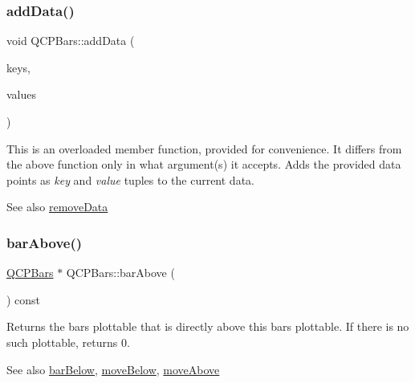 \subsubsection{\texorpdfstring{add\+Data()}{addData()}\hspace{0.1cm}{\footnotesize\ttfamily [4/4]}}
{\footnotesize\ttfamily void Q\+C\+P\+Bars\+::add\+Data (\begin{DoxyParamCaption}\item[{const Q\+Vector$<$ double $>$ \&}]{keys,  }\item[{const Q\+Vector$<$ double $>$ \&}]{values }\end{DoxyParamCaption})}

This is an overloaded member function, provided for convenience. It differs from the above function only in what argument(s) it accepts. Adds the provided data points as {\itshape key} and {\itshape value} tuples to the current data. \begin{DoxySeeAlso}{See also}
\mbox{\hyperlink{class_q_c_p_bars_a1fe9bcb57d670defea1bb65cadf43765}{remove\+Data}} 
\end{DoxySeeAlso}
\mbox{\label{class_q_c_p_bars_ab97f2acd9f6cb40d2cc3c33d278f0e78}} 
\subsubsection{\texorpdfstring{bar\+Above()}{barAbove()}}
{\footnotesize\ttfamily \mbox{\hyperlink{class_q_c_p_bars}{Q\+C\+P\+Bars}} $\ast$ Q\+C\+P\+Bars\+::bar\+Above (\begin{DoxyParamCaption}{ }\end{DoxyParamCaption}) const\hspace{0.3cm}{\ttfamily [inline]}}

Returns the bars plottable that is directly above this bars plottable. If there is no such plottable, returns 0.

\begin{DoxySeeAlso}{See also}
\mbox{\hyperlink{class_q_c_p_bars_a1b58664864b141f45e02044a855b3213}{bar\+Below}}, \mbox{\hyperlink{class_q_c_p_bars_a69fc371346980f19177c3d1ecdad78ee}{move\+Below}}, \mbox{\hyperlink{class_q_c_p_bars_ac22e00a6a41509538c21b04f0a57318c}{move\+Above}} 
\end{DoxySeeAlso}
\mbox{\label{class_q_c_p_bars_a1b58664864b141f45e02044a855b3213}} 
